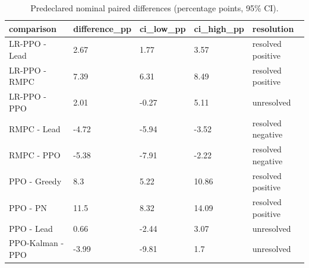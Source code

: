 \begin{table}[t]
\centering
\caption{Predeclared nominal paired differences (percentage points, 95\% CI).}
\label{tab:nominal_differences}
\begin{tabular}{lllll}
\hline
comparison & difference_pp & ci_low_pp & ci_high_pp & resolution \\
\hline
LR-PPO - Lead & 2.67 & 1.77 & 3.57 & resolved positive \\
LR-PPO - RMPC & 7.39 & 6.31 & 8.49 & resolved positive \\
LR-PPO - PPO & 2.01 & -0.27 & 5.11 & unresolved \\
RMPC - Lead & -4.72 & -5.94 & -3.52 & resolved negative \\
RMPC - PPO & -5.38 & -7.91 & -2.22 & resolved negative \\
PPO - Greedy & 8.3 & 5.22 & 10.86 & resolved positive \\
PPO - PN & 11.5 & 8.32 & 14.09 & resolved positive \\
PPO - Lead & 0.66 & -2.44 & 3.07 & unresolved \\
PPO-Kalman - PPO & -3.99 & -9.81 & 1.7 & unresolved \\
\hline
\end{tabular}
\end{table}
